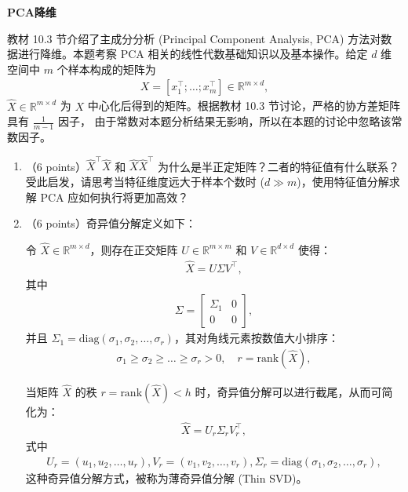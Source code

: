 \documentclass[answers]{exam}  %
\begin{document}
\begin{questions}
\begin{solution}
\begin{parts}
	\end{parts}
\end{solution}

\question [30] \textbf{PCA降维}


教材 10.3 节介绍了主成分分析 (Principal Component Analysis, PCA) 方法对数据进行降维。本题考察 PCA 相关的线性代数基础知识以及基本操作。给定 $d$ 维空间中 $m$ 个样本构成的矩阵为
\begin{align}
X = [x_1^\top; \dots; x_m^\top] \in \mathbb{R}^{m \times d},
\end{align}
$\hat{X} \in \mathbb{R}^{m \times d}$ 为 $X$ 中心化后得到的矩阵。根据教材 10.3 节讨论，严格的协方差矩阵具有 $\frac{1}{m-1}$ 因子， 由于常数对本题分析结果无影响，所以在本题的讨论中忽略该常数因子。
\begin{enumerate}
    \item （6 points）$\hat{X}^\top \hat{X}$ 和 $\hat{X} \hat{X}^\top$ 为什么是半正定矩阵？二者的特征值有什么联系？受此启发，请思考当特征维度远大于样本个数时 ($d \gg m$)，使用特征值分解求解 PCA 应如何执行将更加高效？
    \item （6 points）奇异值分解定义如下：
    
    \vspace{\baselineskip}令 $\hat{X} \in \mathbb{R}^{m \times d}$，则存在正交矩阵 $U \in \mathbb{R}^{m \times m}$ 和 $V \in \mathbb{R}^{d \times d}$ 使得：
    \begin{align}
        \hat{X} = U \Sigma V^\top,
    \end{align}
    其中
    \begin{align}
    \Sigma = \begin{bmatrix}
    \Sigma_1 & 0 \\
    0 & 0
    \end{bmatrix},
    \end{align}
    并且 $\Sigma_1 = \text{diag}(\sigma_1, \sigma_2, \dots, \sigma_r)$，其对角线元素按数值大小排序：
    \begin{align}
        \sigma_1 \geq \sigma_2 \geq \dots \geq \sigma_r > 0, \quad r = \text{rank}(\hat{X}),
    \end{align}

    当矩阵 $\hat{X}$ 的秩 $r = \text{rank}(\hat{X}) < h$ 时，奇异值分解可以进行截尾，从而可简化为：
    \begin{align}
        \hat{X} = U_r \Sigma_r V_r^\top,
    \end{align}
    式中
    \begin{align}
        U_r = (u_1, u_2, \dots, u_r), V_r = (v_1, v_2, \dots, v_r), \Sigma_r = \text{diag}(\sigma_1, \sigma_2, \dots, \sigma_r),
    \end{align}
    这种奇异值分解方式，被称为薄奇异值分解 (Thin SVD)。
    

\end{enumerate}
\end{questions}
\end{document}
